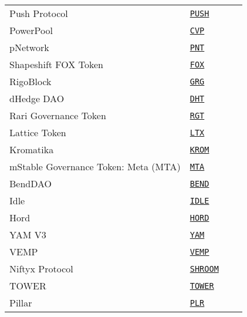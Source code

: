\begin{tabular}{llll}
Push Protocol & \href{https://etherscan.io/address/0xf418588522d5dd018b425E472991E52EBBeEEEEE}{\tt PUSH} \\
PowerPool & \href{https://etherscan.io/address/0x38e4adb44ef08f22f5b5b76a8f0c2d0dcbe7dca1}{\tt CVP} \\
pNetwork & \href{https://etherscan.io/address/0x89ab32156e46f46d02ade3fecbe5fc4243b9aaed}{\tt PNT} \\
Shapeshift FOX Token & \href{https://etherscan.io/address/0xc770eefad204b5180df6a14ee197d99d808ee52d}{\tt FOX} \\
RigoBlock & \href{https://etherscan.io/address/0x4fbb350052bca5417566f188eb2ebce5b19bc964}{\tt GRG} \\
dHedge DAO & \href{https://etherscan.io/address/0xca1207647ff814039530d7d35df0e1dd2e91fa84}{\tt DHT} \\
Rari Governance Token & \href{https://etherscan.io/address/0xd291e7a03283640fdc51b121ac401383a46cc623}{\tt RGT} \\
Lattice Token & \href{https://etherscan.io/address/0xa393473d64d2F9F026B60b6Df7859A689715d092}{\tt LTX} \\
Kromatika & \href{https://etherscan.io/address/0x3af33bef05c2dcb3c7288b77fe1c8d2aeba4d789}{\tt KROM} \\
mStable Governance Token: Meta (MTA) & \href{https://etherscan.io/address/0xa3BeD4E1c75D00fa6f4E5E6922DB7261B5E9AcD2}{\tt MTA} \\
BendDAO & \href{https://etherscan.io/address/0x0d02755a5700414b26ff040e1de35d337df56218}{\tt BEND} \\
Idle & \href{https://etherscan.io/address/0x875773784Af8135eA0ef43b5a374AaD105c5D39e}{\tt IDLE} \\
Hord & \href{https://etherscan.io/address/0x43a96962254855f16b925556f9e97be436a43448}{\tt HORD} \\
YAM V3 & \href{https://etherscan.io/address/0x0aacfbec6a24756c20d41914f2caba817c0d8521}{\tt YAM} \\
VEMP & \href{https://etherscan.io/address/0xcfeb09c3c5f0f78ad72166d55f9e6e9a60e96eec}{\tt VEMP} \\
Niftyx Protocol & \href{https://etherscan.io/address/0xed0439eacf4c4965ae4613d77a5c2efe10e5f183}{\tt SHROOM} \\
TOWER & \href{https://etherscan.io/address/0x1c9922314ed1415c95b9fd453c3818fd41867d0b}{\tt TOWER} \\
Pillar & \href{https://etherscan.io/address/0xe3818504c1b32bf1557b16c238b2e01fd3149c17}{\tt PLR} \\

\end{tabular}
